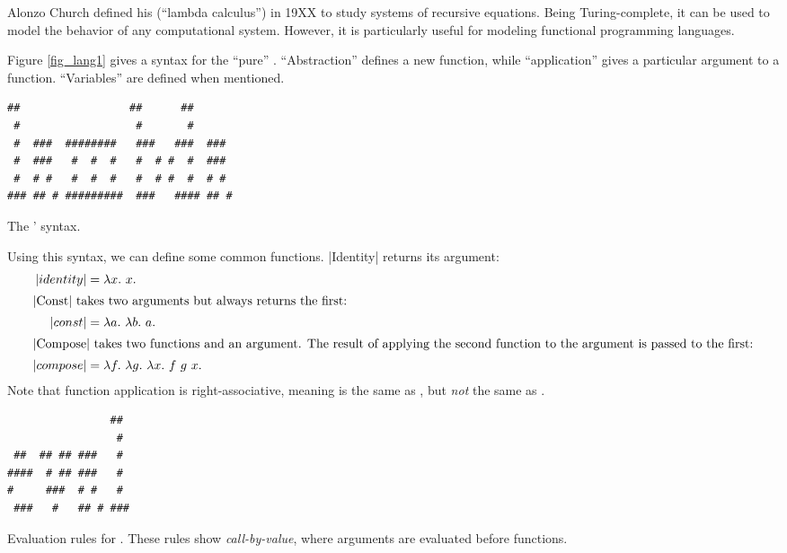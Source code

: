 \documentclass[12pt]{report}
\begin{document}
Alonzo Church defined his \lamA (``lambda calculus'') in 19XX
\citep{ChurchXX} to study systems of recursive equations. Being
Turing-complete, it can be used to model the behavior of any
computational system. However, it is particularly useful for modeling
functional programming languages. %

Figure \ref{fig_lang1} gives a syntax for the ``pure''
\lamA. ``Abstraction'' defines a new function, while ``application''
gives a particular argument to a function. ``Variables'' are defined
when mentioned. 

\begin{myfig}[ht]
\begin{minipage}{3in}
\begin{Verbatim}
##                 ##      ##       
 #                  #       #       
 #  ###  ########   ###   ###  ###  
 #  ###   #  #  #   #  # #  #  ###  
 #  # #   #  #  #   #  # #  #  # #  
### ## # #########  ###   #### ## # 
\end{Verbatim}
\end{minipage}
  \caption{The \lamA' syntax.}
  \label{fig_lang1}
\end{myfig}


Using this syntax, we can define some common functions. |Identity|
returns its argument:
\begin{align}
  |identity| &= \lambda x.\ x. \label{eq_lang2} \\
  \intertext{|Const| takes two arguments but always returns the first:}
  |const| &= \lambda a.\ \lambda b.\ a. \label{eq_lang4} \\
  \intertext{|Compose| takes two functions and an argument. The result of
    applying the second function to the argument is passed to the first:}
  |compose| &= \lambda f.\ \lambda g.\ \lambda x.\ f\ g\ x. \label{eq_lang3} 
\end{align}
Note that function application is right-associative, meaning
 is the same as ,
but \emph{not} the same as .

\begin{myfig}[bt]
\begin{minipage}{2in}
\begin{Verbatim}
                ##  
                 #  
 ##  ## ## ###   #  
####  # ## ###   #  
#     ###  # #   #  
 ###   #   ## # ### 
\end{Verbatim}
\end{minipage}
  \caption{Evaluation rules for \lamA. These rules show 
    \emph{call-by-value}, where arguments are evaluated
    before functions.}
  \label{fig_lang2}
\end{myfig}
\end{document}
